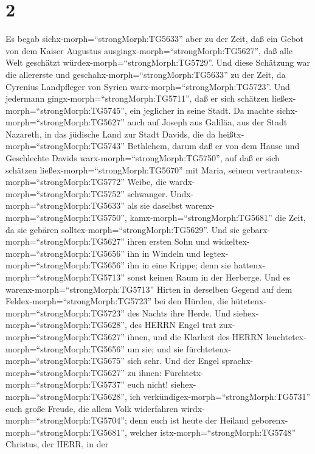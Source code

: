 \hypertarget{section-1}{%
\section{2}\label{section-1}}

 Es begab sichx-morph=``strongMorph:TG5633'' aber zu der
Zeit, daß ein Gebot von dem Kaiser Augustus
ausgingx-morph=``strongMorph:TG5627'', daß alle Welt geschätzt
würdex-morph=``strongMorph:TG5729''.  Und diese Schätzung
war die allererste und geschahx-morph=``strongMorph:TG5633'' zu der
Zeit, da Cyrenius Landpfleger von Syrien
warx-morph=``strongMorph:TG5723''.  Und jedermann
gingx-morph=``strongMorph:TG5711'', daß er sich schätzen
ließex-morph=``strongMorph:TG5745'', ein jeglicher in seine Stadt.
 Da machte sichx-morph=``strongMorph:TG5627'' auch auf
Joseph aus Galiläa, aus der Stadt Nazareth, in das jüdische Land zur
Stadt Davids, die da heißtx-morph=``strongMorph:TG5743'' Bethlehem,
darum daß er von dem Hause und Geschlechte Davids
warx-morph=``strongMorph:TG5750'',  auf daß er sich schätzen
ließex-morph=``strongMorph:TG5670'' mit Maria, seinem
vertrautenx-morph=``strongMorph:TG5772'' Weibe, die
wardx-morph=``strongMorph:TG5752'' schwanger. 
Undx-morph=``strongMorph:TG5633'' als sie daselbst
warenx-morph=``strongMorph:TG5750'', kamx-morph=``strongMorph:TG5681''
die Zeit, da sie gebären solltex-morph=``strongMorph:TG5629''.
 Und sie gebarx-morph=``strongMorph:TG5627'' ihren ersten
Sohn und wickeltex-morph=``strongMorph:TG5656'' ihn in Windeln und
legtex-morph=``strongMorph:TG5656'' ihn in eine Krippe; denn sie
hattenx-morph=``strongMorph:TG5713'' sonst keinen Raum in der Herberge.
 Und es warenx-morph=``strongMorph:TG5713'' Hirten in
derselben Gegend auf dem Feldex-morph=``strongMorph:TG5723'' bei den
Hürden, die hütetenx-morph=``strongMorph:TG5723'' des Nachts ihre Herde.
 Und siehex-morph=``strongMorph:TG5628'', des HERRN Engel
trat zux-morph=``strongMorph:TG5627'' ihnen, und die Klarheit des HERRN
leuchtetex-morph=``strongMorph:TG5656'' um sie; und sie
fürchtetenx-morph=``strongMorph:TG5675'' sich sehr.  Und
der Engel sprachx-morph=``strongMorph:TG5627'' zu ihnen:
Fürchtetx-morph=``strongMorph:TG5737'' euch nicht!
siehex-morph=``strongMorph:TG5628'', ich
verkündigex-morph=``strongMorph:TG5731'' euch große Freude, die allem
Volk widerfahren wirdx-morph=``strongMorph:TG5704'';  denn
euch ist heute der Heiland geborenx-morph=``strongMorph:TG5681'',
welcher istx-morph=``strongMorph:TG5748'' Christus, der HERR, in der
